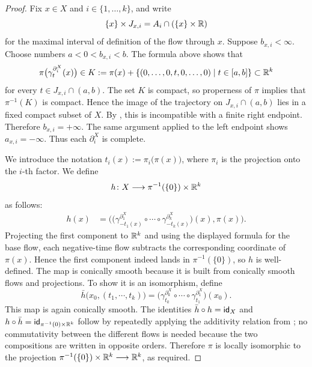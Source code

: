 \begin{proof}
Fix $x\in X$ and $i\in \{1,\ldots,k\}$, and write
\begin{equation}
    \{x\}\times J_{x,i}=A_i\cap (\{x\}\times \mathbb R)
\end{equation}
for the maximal interval of definition of the flow through $x$. Suppose $b_{x,i}<\infty$. Choose numbers $a<0<b_{x,i}<b$. The formula above shows that
\begin{equation}
    \pi\big(\gamma^{\partial^{X}_i}_{t}(x)\big)\in K:=\pi(x)+\{(0,\ldots,0,t,0,\ldots,0)\mid t\in [a,b]\}\subset \mathbb R^k
\end{equation}
for every $t\in J_{x,i}\cap (a,b)$. The set $K$ is compact, so properness of $\pi$ implies that $\pi^{-1}(K)$ is compact. Hence the image of the trajectory on $J_{x,i}\cap (a,b)$ lies in a fixed compact subset of $X$. By , this is incompatible with a finite right endpoint. Therefore $b_{x,i}=+\infty$. The same argument applied to the left endpoint shows $a_{x,i}=-\infty$. Thus each $\partial_i^X$ is complete.

We introduce the notation $t_{i}(x):=\pi_{i}\big(\pi(x)\big)$, where $\pi_i$ is the projection onto the $i$-th factor. We define
\begin{equation}
    h\colon X \longrightarrow \pi^{-1}(\{0\})\times \mathbb R^k
\end{equation}
as follows:
\begin{align}
    h(x) &= \bigg(\Big(\gamma^{\partial^{X}_{1}}_{-t_1(x)}\circ \cdots \circ \gamma^{\partial^{X}_{k}}_{-t_k(x)}\Big)(x), \pi(x)\bigg).
\end{align}
Projecting the first component to $\mathbb R^k$ and using the displayed formula for the base flow, each negative-time flow subtracts the corresponding coordinate of $\pi(x)$. Hence the first component indeed lands in $\pi^{-1}(\{0\})$, so $h$ is well-defined. The map is conically smooth because it is built from conically smooth flows and projections. To show it is an isomorphism, define
\begin{equation}
    \bar{h}\big(x_0,(t_1,\cdots,t_k)\big) = \Big(\gamma^{\partial^{X}_{k}}_{t_k}\circ \cdots \circ \gamma^{\partial^{X}_{1}}_{t_1}\Big)(x_0).
\end{equation} 
This map is again conically smooth. The identities $\bar{h}\circ h = \operatorname{\sf id}_X$ and $h\circ \bar{h}=\operatorname{\sf id}_{\pi^{-1}(0)\times \mathbb R^k}$ follow by repeatedly applying the additivity relation from ; no commutativity between the different flows is needed because the two compositions are written in opposite orders. Therefore $\pi$ is locally isomorphic to the projection $\pi^{-1}(\{0\})\times \mathbb R^k \longrightarrow \mathbb R^k$, as required.
\end{proof}

